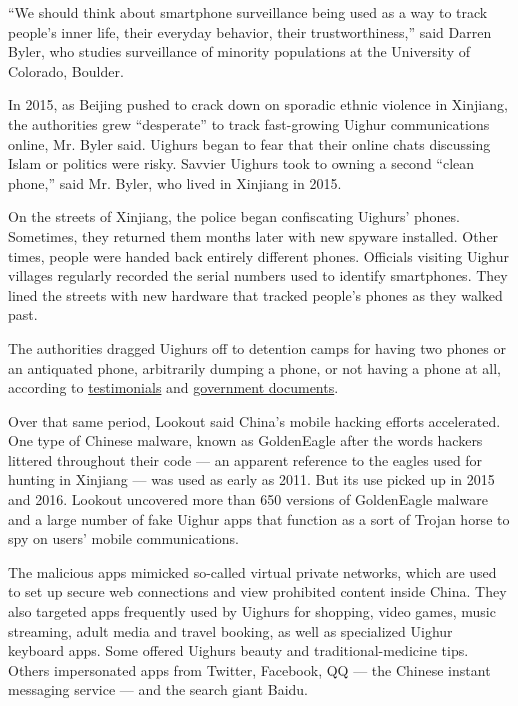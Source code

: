 ``We should think about smartphone surveillance being used as a way to
track people's inner life, their everyday behavior, their
trustworthiness,'' said Darren Byler, who studies surveillance of
minority populations at the University of Colorado, Boulder.

In 2015, as Beijing pushed to crack down on sporadic ethnic violence in
Xinjiang, the authorities grew ``desperate'' to track fast-growing
Uighur communications online, Mr. Byler said. Uighurs began to fear that
their online chats discussing Islam or politics were risky. Savvier
Uighurs took to owning a second ``clean phone,'' said Mr. Byler, who
lived in Xinjiang in 2015.

On the streets of Xinjiang, the police began confiscating Uighurs'
phones. Sometimes, they returned them months later with new spyware
installed. Other times, people were handed back entirely different
phones. Officials visiting Uighur villages regularly recorded the serial
numbers used to identify smartphones. They lined the streets with new
hardware that tracked people's phones as they walked past.

The authorities dragged Uighurs off to detention camps for having two
phones or an antiquated phone, arbitrarily dumping a phone, or not
having a phone at all, according to
\href{https://www.nytimes.com/2019/05/22/world/asia/china-surveillance-xinjiang.html}{testimonials}
and
\href{https://www.nytimes.com/interactive/2019/11/16/world/asia/china-xinjiang-documents.html}{government
documents}.

Over that same period, Lookout said China's mobile hacking efforts
accelerated. One type of Chinese malware, known as GoldenEagle after the
words hackers littered throughout their code --- an apparent reference
to the eagles used for hunting in Xinjiang --- was used as early as
2011. But its use picked up in 2015 and 2016. Lookout uncovered more
than 650 versions of GoldenEagle malware and a large number of fake
Uighur apps that function as a sort of Trojan horse to spy on users'
mobile communications.

The malicious apps mimicked so-called virtual private networks, which
are used to set up secure web connections and view prohibited content
inside China. They also targeted apps frequently used by Uighurs for
shopping, video games, music streaming, adult media and travel booking,
as well as specialized Uighur keyboard apps. Some offered Uighurs beauty
and traditional-medicine tips. Others impersonated apps from Twitter,
Facebook, QQ --- the Chinese instant messaging service --- and the
search giant Baidu.

